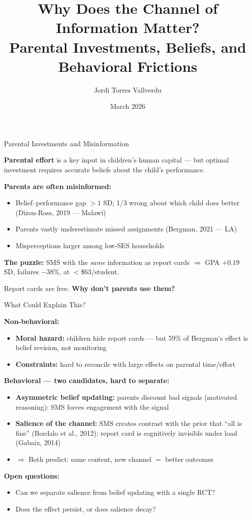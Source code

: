 \documentclass[11pt]{beamer}
\title{Why Does the Channel of Information Matter?\\\large Parental Investments, Beliefs, and Behavioral Frictions}
\author{Jordi Torres Vallverdu}
\institute{MRes TSE --- Behavioral Development Economics}
\date{March 2026}
\begin{document}
\begin{frame}
\titlepage
\end{frame}

\begin{frame}{Parental Investments and Misinformation}

\textbf{Parental effort} is a key input in children's human capital --- but optimal investment requires accurate beliefs about the child's performance.

\bigskip
\textbf{Parents are often misinformed:}
\begin{itemize}
    \item Belief--performance gap $>1$ SD; 1/3 wrong about which child does better \\ {\small (Dizon-Ross, 2019 --- Malawi)}
    \item Parents vastly underestimate missed assignments {\small (Bergman, 2021 --- LA)}
    \item Misperceptions larger among low-SES households
\end{itemize}

\bigskip
\textbf{The puzzle:} SMS with the \emph{same} information as report cards $\Rightarrow$ GPA $+0.19$ SD, failures $-38\%$, at $<$\$63/student.

\medskip
Report cards are free. \textbf{Why don't parents use them?}

\end{frame}

\begin{frame}{What Could Explain This?}

\textbf{Non-behavioral:}
\begin{itemize}
    \item \textbf{Moral hazard:} children hide report cards --- but 59\% of Bergman's effect is belief revision, not monitoring
    \item \textbf{Constraints:} hard to reconcile with large effects on parental time/effort
\end{itemize}

\medskip
\textbf{Behavioral --- two candidates, hard to separate:}
\begin{itemize}
    \item \textbf{Asymmetric belief updating:} parents discount bad signals (motivated reasoning); SMS forces engagement with the signal
    \item \textbf{Salience of the channel:} SMS creates contrast with the prior that ``all is fine'' (Bordalo et al., 2012); report card is cognitively invisible under load (Gabaix, 2014)
    \item[] $\Rightarrow$ Both predict: same content, new channel $=$ better outcomes
\end{itemize}

\medskip
\textbf{Open questions:}
\begin{itemize}
    \item Can we separate salience from belief updating with a single RCT?
    \item Does the effect persist, or does salience decay?
\end{itemize}

\end{frame}
\end{document}
